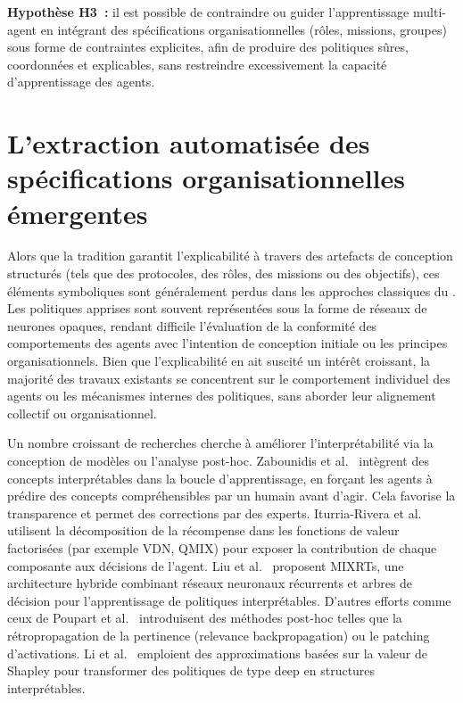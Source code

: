 \medskip

\noindent
\textbf{Hypothèse H3~:} il est possible de contraindre ou guider l'apprentissage multi-agent en intégrant des spécifications organisationnelles (rôles, missions, groupes) sous forme de contraintes explicites, afin de produire des politiques sûres, coordonnées et explicables, sans restreindre excessivement la capacité d'apprentissage des agents.






\section{L'extraction automatisée des spécifications organisationnelles émergentes}

Alors que la tradition  garantit l'explicabilité à travers des artefacts de conception structurés (tels que des protocoles, des rôles, des missions ou des objectifs), ces éléments symboliques sont généralement perdus dans les approches classiques du . Les politiques apprises sont souvent représentées sous la forme de réseaux de neurones opaques, rendant difficile l'évaluation de la conformité des comportements des agents avec l'intention de conception initiale ou les principes organisationnels. Bien que l'explicabilité en  ait suscité un intérêt croissant, la majorité des travaux existants se concentrent sur le comportement individuel des agents ou les mécanismes internes des politiques, sans aborder leur alignement collectif ou organisationnel.

Un nombre croissant de recherches cherche à améliorer l'interprétabilité via la conception de modèles ou l'analyse post-hoc. Zabounidis et al.~\cite{zabounidis2023concept} intègrent des concepts interprétables dans la boucle d'apprentissage, en forçant les agents à prédire des concepts compréhensibles par un humain avant d'agir. Cela favorise la transparence et permet des corrections par des experts. Iturria-Rivera et al.~\cite{iturria2024explainable} utilisent la décomposition de la récompense dans les fonctions de valeur factorisées (par exemple VDN, QMIX) pour exposer la contribution de chaque composante aux décisions de l'agent. Liu et al.~\cite{liu2025} proposent MIXRTs, une architecture hybride combinant réseaux neuronaux récurrents et arbres de décision pour l'apprentissage de politiques interprétables. D'autres efforts comme ceux de Poupart et al.~\cite{poupart2025perspectives} introduisent des méthodes post-hoc telles que la rétropropagation de la pertinence (relevance backpropagation) ou le patching d'activations. Li et al.~\cite{li2025from} emploient des approximations basées sur la valeur de Shapley pour transformer des politiques de type deep  en structures interprétables.

